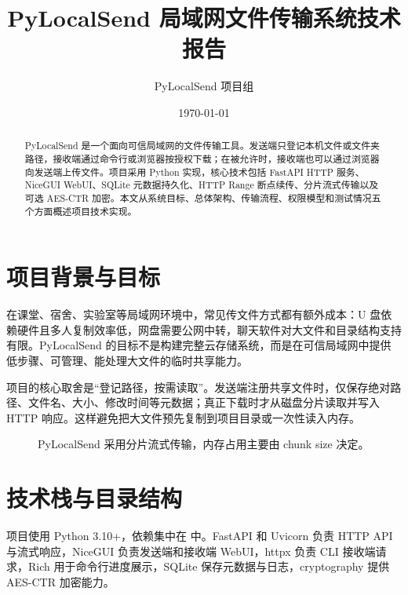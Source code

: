 \documentclass[UTF8,zihao=-4]{ctexart}
\title{\bfseries PyLocalSend 局域网文件传输系统技术报告}
\author{PyLocalSend 项目组}
\date{\today}
\newcommand{\code}[1]{\texttt{\detokenize{#1}}}
\begin{document}
\maketitle

\begin{abstract}
PyLocalSend 是一个面向可信局域网的文件传输工具。发送端只登记本机文件或文件夹路径，接收端通过命令行或浏览器按授权下载；在被允许时，接收端也可以通过浏览器向发送端上传文件。项目采用 Python 实现，核心技术包括 FastAPI HTTP 服务、NiceGUI WebUI、SQLite 元数据持久化、HTTP Range 断点续传、分片流式传输以及可选 AES-CTR 加密。本文从系统目标、总体架构、传输流程、权限模型和测试情况五个方面概述项目技术实现。
\end{abstract}

\section{项目背景与目标}

在课堂、宿舍、实验室等局域网环境中，常见传文件方式都有额外成本：U 盘依赖硬件且多人复制效率低，网盘需要公网中转，聊天软件对大文件和目录结构支持有限。PyLocalSend 的目标不是构建完整云存储系统，而是在可信局域网中提供低步骤、可管理、能处理大文件的临时共享能力。

项目的核心取舍是“登记路径，按需读取”。发送端注册共享文件时，仅保存绝对路径、文件名、大小、修改时间等元数据；真正下载时才从磁盘分片读取并写入 HTTP 响应。这样避免把大文件预先复制到项目目录或一次性读入内存。

\begin{figure}[H]
  \centering
  
  \caption{PyLocalSend 采用分片流式传输，内存占用主要由 chunk size 决定。}
\end{figure}

\section{技术栈与目录结构}

项目使用 Python 3.10+，依赖集中在 \code{pyproject.toml} 中。FastAPI 和 Uvicorn 负责 HTTP API 与流式响应，NiceGUI 负责发送端和接收端 WebUI，httpx 负责 CLI 接收端请求，Rich 用于命令行进度展示，SQLite 保存元数据与日志，cryptography 提供 AES-CTR 加密能力。
\end{document}
